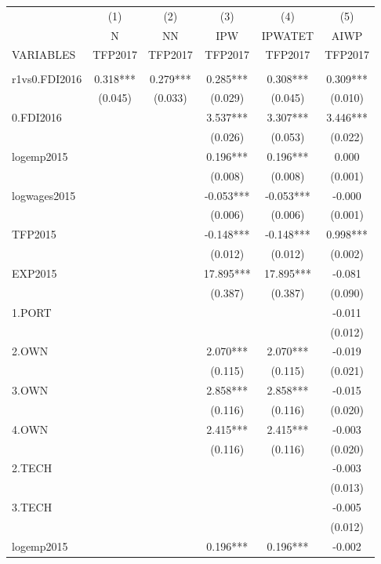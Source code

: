 \documentclass[]{article}
\begin{document}
\begin{landscape} 
\centering
\begin{adjustbox}{width=1\textwidth}
\begin{tabular}{lccccc} \hline
 & (1) & (2) & (3) & (4) & (5) \\
 & N & NN & IPW & IPWATET & AIWP \\
VARIABLES & TFP2017 & TFP2017 & TFP2017 & TFP2017 & TFP2017 \\ \hline
 &  &  &  &  &  \\
r1vs0.FDI2016 & 0.318*** & 0.279*** & 0.285*** & 0.308*** & 0.309*** \\
 & (0.045) & (0.033) & (0.029) & (0.045) & (0.010) \\
0.FDI2016 &  &  & 3.537*** & 3.307*** & 3.446*** \\
 &  &  & (0.026) & (0.053) & (0.022) \\
logemp2015 &  &  & 0.196*** & 0.196*** & 0.000 \\
 &  &  & (0.008) & (0.008) & (0.001) \\
logwages2015 &  &  & -0.053*** & -0.053*** & -0.000 \\
 &  &  & (0.006) & (0.006) & (0.001) \\
TFP2015 &  &  & -0.148*** & -0.148*** & 0.998*** \\
 &  &  & (0.012) & (0.012) & (0.002) \\
EXP2015 &  &  & 17.895*** & 17.895*** & -0.081 \\
 &  &  & (0.387) & (0.387) & (0.090) \\
1.PORT &  &  &  &  & -0.011 \\
 &  &  &  &  & (0.012) \\
2.OWN &  &  & 2.070*** & 2.070*** & -0.019 \\
 &  &  & (0.115) & (0.115) & (0.021) \\
3.OWN &  &  & 2.858*** & 2.858*** & -0.015 \\
 &  &  & (0.116) & (0.116) & (0.020) \\
4.OWN &  &  & 2.415*** & 2.415*** & -0.003 \\
 &  &  & (0.116) & (0.116) & (0.020) \\
2.TECH &  &  &  &  & -0.003 \\
 &  &  &  &  & (0.013) \\
3.TECH &  &  &  &  & -0.005 \\
 &  &  &  &  & (0.012) \\
logemp2015 &  &  & 0.196*** & 0.196*** & -0.002 \\

\end{tabular}
\end{adjustbox}
\end{landscape}
\end{document}
